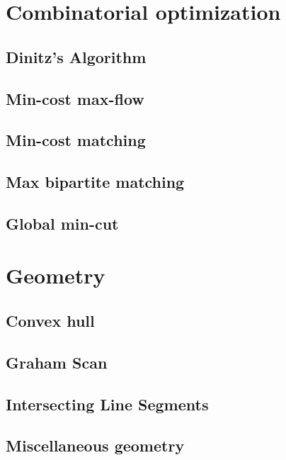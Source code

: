 \section{Combinatorial optimization}
\subsection{Dinitz's Algorithm}
\raggedbottom
\hrulefill
\subsection{Min-cost max-flow}
\raggedbottom
\hrulefill
\subsection{Min-cost matching}
\raggedbottom
\hrulefill
\subsection{Max bipartite matching}
\raggedbottom
\hrulefill
\subsection{Global min-cut}
\raggedbottom
\hrulefill

\section{Geometry}
\subsection{Convex hull}
\raggedbottom
\hrulefill
\subsection{Graham Scan}
\raggedbottom
\hrulefill
\subsection{Intersecting Line Segments}
\raggedbottom
\hrulefill
\subsection{Miscellaneous geometry}
\raggedbottom
\hrulefill

